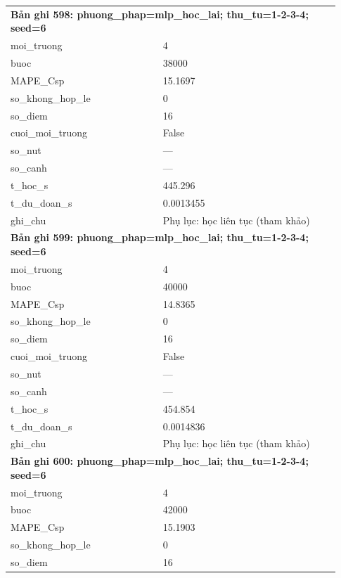 \begin{longtable}{p{0.43\linewidth}p{0.50\linewidth}}
\midrule
\multicolumn{2}{p{0.95\linewidth}}{\textbf{Bản ghi 598: phuong\_phap=mlp\_hoc\_lai; thu\_tu=1-2-3-4; seed=6}} \\
moi\_\allowbreak truong & 4 \\
buoc & 38000 \\
MAPE\_\allowbreak Csp & 15.1697 \\
so\_\allowbreak khong\_\allowbreak hop\_\allowbreak le & 0 \\
so\_\allowbreak diem & 16 \\
cuoi\_\allowbreak moi\_\allowbreak truong & False \\
so\_\allowbreak nut & — \\
so\_\allowbreak canh & — \\
t\_\allowbreak hoc\_\allowbreak s & 445.296 \\
t\_\allowbreak du\_\allowbreak doan\_\allowbreak s & 0.0013455 \\
ghi\_\allowbreak chu & Phụ lục: học liên tục (tham khảo) \\
\midrule
\multicolumn{2}{p{0.95\linewidth}}{\textbf{Bản ghi 599: phuong\_phap=mlp\_hoc\_lai; thu\_tu=1-2-3-4; seed=6}} \\
moi\_\allowbreak truong & 4 \\
buoc & 40000 \\
MAPE\_\allowbreak Csp & 14.8365 \\
so\_\allowbreak khong\_\allowbreak hop\_\allowbreak le & 0 \\
so\_\allowbreak diem & 16 \\
cuoi\_\allowbreak moi\_\allowbreak truong & False \\
so\_\allowbreak nut & — \\
so\_\allowbreak canh & — \\
t\_\allowbreak hoc\_\allowbreak s & 454.854 \\
t\_\allowbreak du\_\allowbreak doan\_\allowbreak s & 0.0014836 \\
ghi\_\allowbreak chu & Phụ lục: học liên tục (tham khảo) \\
\midrule
\multicolumn{2}{p{0.95\linewidth}}{\textbf{Bản ghi 600: phuong\_phap=mlp\_hoc\_lai; thu\_tu=1-2-3-4; seed=6}} \\
moi\_\allowbreak truong & 4 \\
buoc & 42000 \\
MAPE\_\allowbreak Csp & 15.1903 \\
so\_\allowbreak khong\_\allowbreak hop\_\allowbreak le & 0 \\
so\_\allowbreak diem & 16 \\

\end{longtable}
